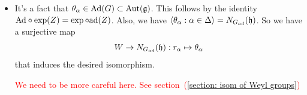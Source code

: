 \begin{itemize}
    reflection $s_\alpha$ can be extended to an automorphism of $\fr{g}$.
    \begin{dang}
        \begin{remark}
            If $\delta\in\text{Der}(\fr{g})$ is a nilpotent derivation, then $\exp(\delta)\in\Aut(\fr{g})$.
        \end{remark}
    \end{dang}
    \item It's a fact that $\theta_\alpha \in \text{Ad}(G)\subset\text{Aut}(\mathfrak{g})$. This follows by the identity 
    $\text{Ad}\circ\exp(Z)=\exp\circ\text{ad}(Z)$. Also, we have  
    $\langle \theta_\alpha:\alpha\in\Delta \rangle=N_{G_{ad}}(\mathfrak{h})$. So we have a surjective map 
    \begin{equation}
        W\to N_{G_{ad}}(\mathfrak{h}): r_\alpha\mapsto \theta_\alpha
    \end{equation}
    that induces the desired isomorphism.

    \begin{center}
        \textcolor{red}{We need to be more careful here. See section~(\ref{section: isom of Weyl groups})}
    \end{center}
\end{itemize}

